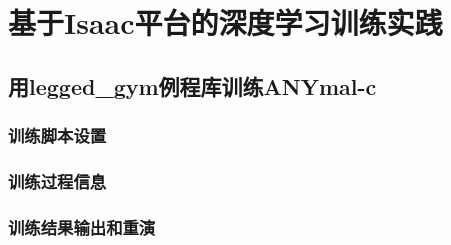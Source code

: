 
\chapter[基于Isaac平台的深度学习训练实践]{基于Isaac平台的深度学习训练实践}

\section[用legged\_gym例程库训练ANYmal-c]{用legged\_gym例程库训练ANYmal-c}

\subsection[训练脚本设置]{训练脚本设置}

\subsection[训练过程信息]{训练过程信息}

\subsection[训练结果输出和重演]{训练结果输出和重演}